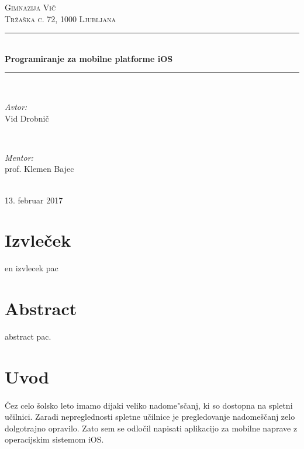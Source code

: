 \documentclass[a4paper, 12pt]{article}
\begin{document}
	\begin{titlepage}
		\newcommand{\HRule}{\rule{\linewidth}{0.5mm}}
		\center
		
		\textsc{\LARGE Gimnazija Vič}\\[0.5cm]
		\textsc{\Large Tržaška c. 72, 1000 Ljubljana}\\[1.5cm]

		\HRule \\[0.4cm]
		{ \huge \bfseries Programiranje za mobilne platforme iOS}\\[0.4cm]
		\HRule \\[1.5cm]
		
		\begin{minipage}{0.4\textwidth}
			\begin{flushleft} \large
				\emph{Avtor:}\\
				Vid Drobnič
			\end{flushleft}
		\end{minipage}
		~
		\begin{minipage}{0.4\textwidth}
			\begin{flushright} \large
				\emph{Mentor:} \\
				prof. Klemen Bajec
			\end{flushright}
		\end{minipage}\\[4cm]
		
		{\large 13. februar 2017}\\[3cm]
		\vfill
	\end{titlepage}
	
	\section*{Izvleček}
	en izvlecek pac
	
	\section*{Abstract}
	abstract pac.
	
	\pagebreak
	
	\tableofcontents
	\pagebreak
	
	\section{Uvod}
	\paragraph{} Čez celo šolsko leto imamo dijaki veliko nadome"sčanj, ki so dostopna na spletni učilnici. Zaradi nepreglednosti spletne učilnice je pregledovanje nadomeščanj zelo dolgotrajno opravilo. Zato sem se odločil napisati aplikacijo za mobilne naprave z operacijskim sistemom iOS.
	
\end{document}
